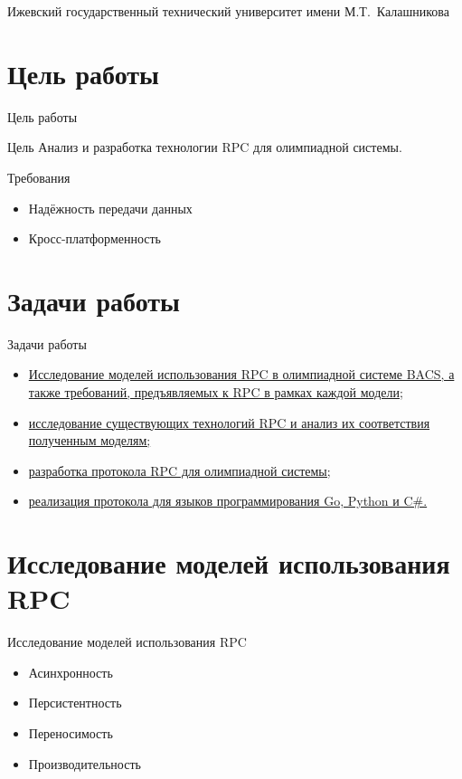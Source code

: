 \documentclass[xetex,mathserif,serif,10pt]{beamer}
\newenvironment{sframe}[2]{\section{#1}\begin{frame}[label=#2]{#1}}{\end{frame}}
\begin{document}
    \title[RPC]{\titletext}
    \author[Филиппов]{А.~Филиппов}
    \institute
    {
        Ижевский государственный технический университет имени М.Т.~Калашникова
    }

    

    \begin{sframe}{Цель работы}{target}
        \begin{block}{Цель}
            Анализ и разработка технологии RPC для олимпиадной системы.
        \end{block}

        \begin{block}{Требования}
            \begin{itemize}
                \item Надёжность передачи данных
                \item Кросс-платформенность
            \end{itemize}
        \end{block}
    \end{sframe}

    \begin{sframe}{Задачи работы}{problems}
        \begin{itemize}
            \item \hyperlink{analysis}{Исследование моделей использования RPC
                в олимпиадной системе BACS, а также требований,
                предъявляемых к RPC в рамках каждой модели};
            \item \hyperlink{review}{исследование существующих технологий RPC
                и анализ их соответствия полученным моделям;}
            \item \hyperlink{protodev}{разработка протокола RPC
                для олимпиадной системы;}
            \item \hyperlink{binddev}{реализация протокола для языков
                программирования Go, Python и C\#.}
        \end{itemize}
    \end{sframe}

    \begin{sframe}{Исследование моделей использования RPC}{analysis}
        \begin{itemize}
            \item Асинхронность
            \item Персистентность
            \item Переносимость
            \item Производительность
        \end{itemize}
        \begin{figure}
            \centering
            \resizebox*{!}{0.6\textheight}{}
        \end{figure}
    \end{sframe}
\end{document}
